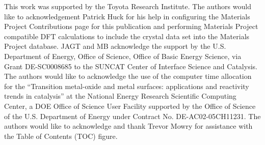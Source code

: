 

This work was supported by the Toyota Research Institute.
%
The authors would like to acknowledgement Patrick Huck for his help in configuring the Materials Project Contributions page for this publication and performing Materials Project compatible DFT calculations to include the \IrOx crystal data set into the Materials Project database.
%
JAGT and MB acknowledge the support by the U.S. Department of Energy, Office
of Science, Office of Basic Energy Science, via Grant DE-SC0008685 to the
SUNCAT Center of Interface Science and Catalysis.
%
The authors would like to acknowledge the use of the computer time allocation
for the
“Transition metal-oxide and metal surfaces: applications and
reactivity trends in catalysis”
at the National Energy Research Scientific Computing Center, a DOE Office of Science User Facility supported by the Office of Science of the U.S. Department of Energy under Contract No. DE-AC02-05CH11231.
%
The authors would like to acknowledge and thank Trevor Mowry for assistance with the Table of Contents (TOC) figure.
